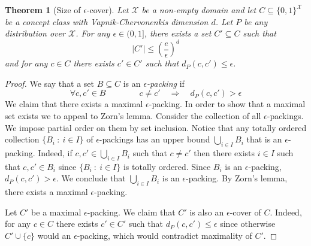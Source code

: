 \documentclass[11pt]{article}
\newtheorem{theorem}[proposition]{Theorem}
\newcommand{\X}{\mathcal{X}}
\begin{document}
\begin{theorem}[Size of $\epsilon$-cover]
Let $\X$ be a non-empty domain and let $C \subseteq \{0,1\}^\X$ be a concept
class with Vapnik-Chervonenkis dimension $d$. Let $P$ be any distribution over
$\X$. For any $\epsilon \in (0,1]$, there exists a set $C' \subseteq C$ such that
\begin{equation}
\label{equation:theorem-epsilon-cover}
|C'| \le \left( \frac{e}{\epsilon} \right)^d
\end{equation}
and for any $c \in C$ there exists $c' \in C'$ such that $d_P(c,c') \le \epsilon$.
\end{theorem}

\begin{proof}
We say that a set $B \subseteq C$ is an \emph{$\epsilon$-packing} if
$$
\forall c,c' \in B \qquad \qquad c \neq c' \quad \Longrightarrow \quad d_P(c,c') > \epsilon
$$
We claim that there exists a maximal $\epsilon$-packing. In order to show that a
maximal set exists we to appeal to Zorn's lemma. Consider the collection of all
$\epsilon$-packings. We impose partial order on them by set inclusion. Notice
that any totally ordered collection $\{ B_i ~:~ i \in I \}$ of
$\epsilon$-packings has an upper bound $\bigcup_{i \in I} B_i$ that is an
$\epsilon$-packing. Indeed, if $c,c' \in \bigcup_{i \in I} B_i$ such that $c
\neq c'$ then there exists $i \in I$ such that $c,c' \in B_i$ since $\{ B_i ~:~
i \in I \}$ is totally ordered. Since $B_i$ is an $\epsilon$-packing, $d_P(c,c') >
\epsilon$. We conclude that $\bigcup_{i \in I} B_i$ is an $\epsilon$-packing. By
Zorn's lemma, there exists a maximal $\epsilon$-packing.

Let $C'$ be a maximal $\epsilon$-packing. We claim that $C'$ is also an
$\epsilon$-cover of $C$. Indeed, for any $c \in C$ there exists $c' \in C'$ such
that $d_P(c,c') \le \epsilon$ since otherwise $C' \cup \{c\}$ would an
$\epsilon$-packing, which would contradict maximality of $C'$.


\end{proof}
\end{document}
